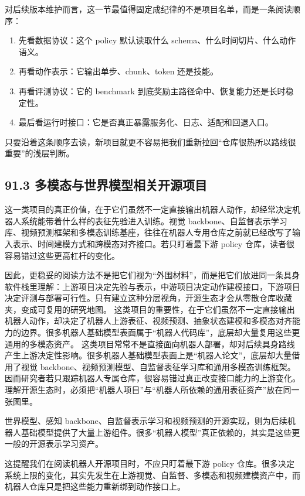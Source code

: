 对后续版本维护而言，这一节最值得固定成纪律的不是项目名单，而是一条阅读顺序：

\begin{enumerate}
\item 先看数据协议：这个 policy 默认读取什么 schema、什么时间切片、什么动作语义。
\item 再看动作表示：它输出单步、chunk、token 还是技能。
\item 再看评测协议：它的 benchmark 到底奖励主路径命中、恢复能力还是长时稳定性。
\item 最后看运行时接口：它是否真正暴露服务化、日志、适配和回退入口。
\end{enumerate}

只要沿着这条顺序去读，新项目就更不容易把我们重新拉回“仓库很热所以路线很重要”的浅层判断。

\subsection*{91.3 多模态与世界模型相关开源项目}


这一类项目的真正价值，在于它们虽然不一定直接输出机器人动作，却经常决定机器人系统能带着什么样的表征先验进入训练。视觉 backbone、自监督表示学习库、视频预测框架和多模态训练基座，往往在机器人专用仓库之前就已经改写了输入表示、时间建模方式和跨模态对齐接口。若只盯着最下游 policy 仓库，读者很容易错过这些更高杠杆的变化。

因此，更稳妥的阅读方法不是把它们视为“外围材料”，而是把它们放进同一条具身软件栈里理解：上游项目决定先验与表示，中游项目决定动作建模接口，下游项目决定评测与部署可行性。只有建立这种分层视角，开源生态才会从零散仓库收藏夹，变成可复用的研究地图。 这类项目的重要性，在于它们虽然不一定直接输出机器人动作，却决定了机器人上游表征、视频预测、抽象状态建模和多模态对齐能力的边界。很多机器人基础模型表面属于“机器人代码库”，底层却大量复用这些更通用的多模态资产。 这类项目常常不是直接面向机器人部署，却对后续具身路线产生上游决定性影响。很多机器人基础模型表面上是“机器人论文”，底层却大量借用了视觉 backbone、视频预测模型、自监督表征学习库和通用多模态训练框架。因而研究者若只跟踪机器人专属仓库，很容易错过真正改变接口能力的上游变化。理解开源生态时，必须把“机器人项目”与“机器人所依赖的通用表征资产”放在同一张图里。

世界模型、感知 backbone、自监督表示学习和视频预测的开源实现，则为后续机器人基础模型提供了大量上游组件。很多“机器人模型”真正依赖的，其实是这些更一般的开源表示学习资产。

这提醒我们在阅读机器人开源项目时，不应只盯着最下游 policy 仓库。很多决定系统上限的变化，其实先发生在上游视觉、自监督、多模态和视频建模资产中，而机器人仓库只是把这些能力重新绑到动作接口上。

